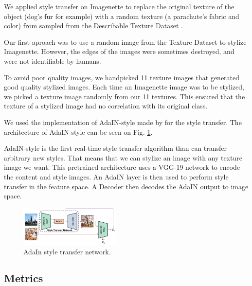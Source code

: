 \documentclass{article}
\begin{document}
\noindent
We applied style transfer on Imagenette to replace the original texture of the object (dog's fur for example) 
with a random texture (a parachute's fabric and color) 
from sampled from the Describable Texture Dataset \cite{cimpoi14describing}. \medskip \par

\noindent
Our first aproach was to use a random image from the Texture Dataset to stylize Imagenette. However, 
the edges of the images were sometimes destroyed, and were not identifiable by humans. \medskip \par

\noindent
To avoid poor quality images, we handpicked 11 texture images that generated good quality stylized images.
Each time an Imagenette image was to be stylized, we picked a texture image randomly from our 11 textures.
This ensured that the texture of a stylized image had no correlation with its original class. \medskip \par

\noindent
We used the implementation of AdaIN-style \cite{huang2017arbitrary} made by \cite{stylizeddatasets2019}
for the style transfer. The architecture of AdaIN-style can be seen on Fig. \ref{adain-archi}.
\medskip \par
\vspace{-0.2cm}
\noindent
AdaIN-style is the first real-time style transfer algorithm than can transfer arbitrary new styles.
That means that we can stylize an image with any texture image we want.
This pretrained architecture uses a VGG-19 network to encode the content and style images.
An AdaIN layer is then used to perform style transfer in the feature space.   
A Decoder then decodes the AdaIN output to image space.

\begin{figure}[h!]\center
  \includegraphics[width=0.45\textwidth]{imgs/adain_architecture}
  \caption{AdaIn style transfer network.}
  \label{adain-archi}
\end{figure}

\newpage
\subsection{Metrics}
\end{document}

